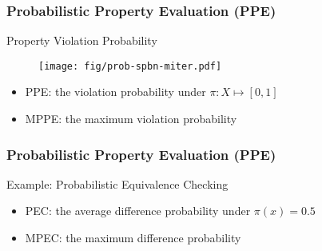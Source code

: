 \begin{frame}
  \frametitle{Probabilistic Property Evaluation (PPE)}
  \begin{block}{Property Violation Probability}
    \begin{figure}
      \centering
      \texttt{[image: fig/prob-spbn-miter.pdf]}
    \end{figure}
    \pause
    \begin{itemize}
      \item PPE: the violation probability under $\pi:X\mapsto[0,1]$
            \pause
      \item MPPE: the maximum violation probability
    \end{itemize}
  \end{block}
\end{frame}

\begin{frame}
  \frametitle{Probabilistic Property Evaluation (PPE)}
  \begin{block}{Example: Probabilistic Equivalence Checking}
    \begin{figure}
      \centering
      
    \end{figure}
    \pause
    \begin{itemize}
      \item PEC: the average difference probability under $\pi(x)=0.5$
            \pause
      \item MPEC: the maximum difference probability
    \end{itemize}
  \end{block}
\end{frame}